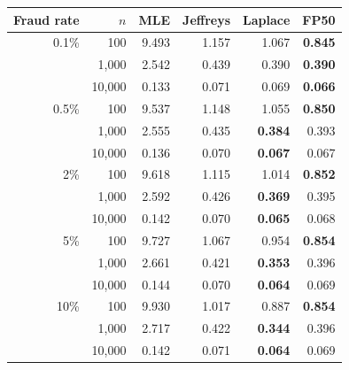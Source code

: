 \begin{tabular}{rrrrrr}\toprule
Fraud rate & $n$ & MLE & Jeffreys & Laplace & FP50\\\midrule
0.1\% & 100 & 9.493 & 1.157 & 1.067 & \textbf{0.845}\\
 & 1,000 & 2.542 & 0.439 & 0.390 & \textbf{0.390}\\
 & 10,000 & 0.133 & 0.071 & 0.069 & \textbf{0.066}\\
\midrule
0.5\% & 100 & 9.537 & 1.148 & 1.055 & \textbf{0.850}\\
 & 1,000 & 2.555 & 0.435 & \textbf{0.384} & 0.393\\
 & 10,000 & 0.136 & 0.070 & \textbf{0.067} & 0.067\\
\midrule
2\% & 100 & 9.618 & 1.115 & 1.014 & \textbf{0.852}\\
 & 1,000 & 2.592 & 0.426 & \textbf{0.369} & 0.395\\
 & 10,000 & 0.142 & 0.070 & \textbf{0.065} & 0.068\\
\midrule
5\% & 100 & 9.727 & 1.067 & 0.954 & \textbf{0.854}\\
 & 1,000 & 2.661 & 0.421 & \textbf{0.353} & 0.396\\
 & 10,000 & 0.144 & 0.070 & \textbf{0.064} & 0.069\\
\midrule
10\% & 100 & 9.930 & 1.017 & 0.887 & \textbf{0.854}\\
 & 1,000 & 2.717 & 0.422 & \textbf{0.344} & 0.396\\
 & 10,000 & 0.142 & 0.071 & \textbf{0.064} & 0.069\\
\bottomrule\end{tabular}